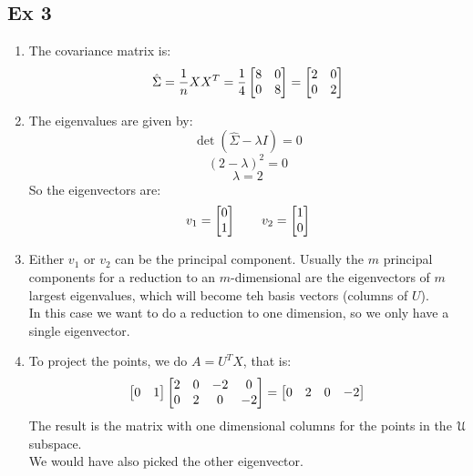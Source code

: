 \documentclass[12pt]{article}
\begin{document}
\newpage

\subsection*{Ex 3}
\begin{enumerate}[label = \letters]
    \item 
    The covariance matrix is:
    \[ \hat{\Sigma} = \dfrac{1}{n}XX^T
    = \dfrac{1}{4}\begin{bmatrix} 8 & 0 \\ 0 & 8 \end{bmatrix}
    = \begin{bmatrix} 2 & 0 \\ 0 & 2 \end{bmatrix} \]
    \item 
    The eigenvalues are given by:
    \[ \det(\hat{\Sigma} - \lambda I) = 0 \]
    \[ (2-\lambda)^2 = 0 \]
    \[ \lambda = 2 \]
    So the eigenvectors are:
    \[ v_1 = \begin{bmatrix} 0 \\ 1 \end{bmatrix} \qquad v_2 = \begin{bmatrix} 1 \\ 0 \end{bmatrix} \]
    \item 
    Either $v_1$ or $v_2$ can be the principal component.
    Usually the $m$ principal components
    for a reduction to an $m$-dimensional
    are the eigenvectors of $m$ largest eigenvalues,
    which will become teh basis vectors (columns of $U$). \\
    In this case we want to do a reduction to one dimension,
    so we only have a single eigenvector. \\ 
    \item 
    To project the points, we do $A = U^TX$,
    that is:
    \[ \begin{bmatrix} 0 & 1 \end{bmatrix} \begin{bmatrix} 2 & 0 & -2 & 0 \\
    0 & 2 & 0 & -2 \end{bmatrix} = \begin{bmatrix} 0 & 2 & 0 & -2 \end{bmatrix} \]
    The result is the matrix with one dimensional
    columns for the points in the $\mathcal{U}$ subspace. \\
    We would have also picked the other eigenvector. \\
\end{enumerate}

\end{document}

